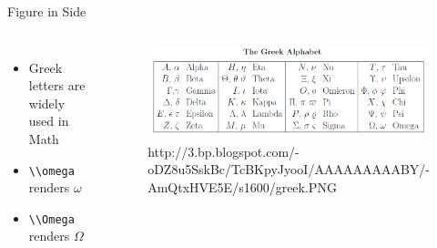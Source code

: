 \begin{frame}{Figure in Side}
\begin{columns}

\begin{itemize}
\item Greek letters are widely used in Math
\item \lstinline|\\omega| renders $\omega$
\item \lstinline|\\Omega| renders $\Omega$
\end{itemize}

\begin{figure}[!h]
\includegraphics[width=\textwidth]{assets/greek.png}
\caption{http://3.bp.blogspot.com/-oDZ8u5SskBc/TcBKpyJyooI/AAAAAAAAABY/-AmQtxHVE5E/s1600/greek.PNG}
\end{figure}

\end{columns}
\end{frame}

